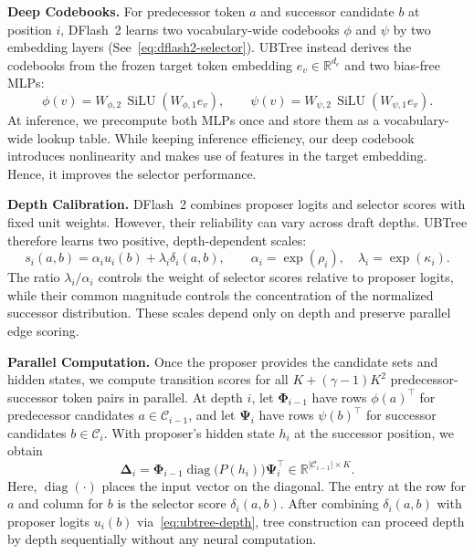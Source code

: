 \noindent\textbf{Deep Codebooks.}
For predecessor token $a$ and successor candidate $b$ at position $i$, DFlash~2 learns two vocabulary-wide codebooks $\phi$ and $\psi$ by two embedding layers (See~\eqref{eq:dflash2-selector}). UBTree instead derives the codebooks from the frozen target token embedding $e_v\in\mathbb R^{d_e}$ and two bias-free MLPs:
\begin{equation}
  \phi(v)=W_{\phi,2}\,\operatorname{SiLU}(W_{\phi,1}e_v),
  \qquad
  \psi(v)=W_{\psi,2}\,\operatorname{SiLU}(W_{\psi,1}e_v).
  \label{eq:ubtree-codebook}
\end{equation}
At inference, we precompute both MLPs once and store them as a vocabulary-wide lookup table. While keeping inference efficiency, our deep codebook introduces nonlinearity and makes use of features in the target embedding. Hence, it improves the selector performance.

\noindent\textbf{Depth Calibration.}
DFlash~2 combines proposer logits and selector scores with fixed unit weights. However, their reliability can vary across draft depths. UBTree therefore learns two positive, depth-dependent scales:
\begin{equation}
    s_i(a,b)=\alpha_i u_i(b)+\lambda_i\delta_i(a,b),
    \qquad
    \alpha_i=\exp(\rho_i),\quad
    \lambda_i=\exp(\kappa_i).
    \label{eq:ubtree-depth}
\end{equation}
The ratio $\lambda_i/\alpha_i$ controls the weight of selector scores relative to proposer logits, while their common magnitude controls the concentration of the normalized successor distribution. These scales depend only on depth and preserve parallel edge scoring.

\noindent\textbf{Parallel Computation.}
Once the proposer provides the candidate sets and hidden states, we compute transition scores for all $K+(\gamma-1)K^2$ predecessor-successor token pairs in parallel. At depth $i$, let $\boldsymbol{\Phi}_{i-1}$ have rows $\phi(a)^\top$ for predecessor candidates $a\in\mathcal C_{i-1}$, and let $\boldsymbol{\Psi}_i$ have rows $\psi(b)^\top$ for successor candidates $b\in\mathcal C_i$. With proposer's hidden state $h_i$ at the successor position, we obtain
\begin{equation}
    \boldsymbol\Delta_i
    =\boldsymbol{\Phi}_{i-1}\operatorname{diag}\!\bigl(P(h_i)\bigr)\boldsymbol{\Psi}_i^\top
    \in\mathbb R^{|\mathcal C_{i-1}|\times K}.
    \label{eq:ubtree-edge-matrix}
\end{equation}
Here, $\operatorname{diag}(\cdot)$ places the input vector on the diagonal. The entry at the row for $a$ and column for $b$ is the selector score $\delta_i(a,b)$. After combining $\delta_i(a,b)$ with proposer logits $u_i(b)$ via~\eqref{eq:ubtree-depth}, tree construction can proceed depth by depth sequentially without any neural computation.
